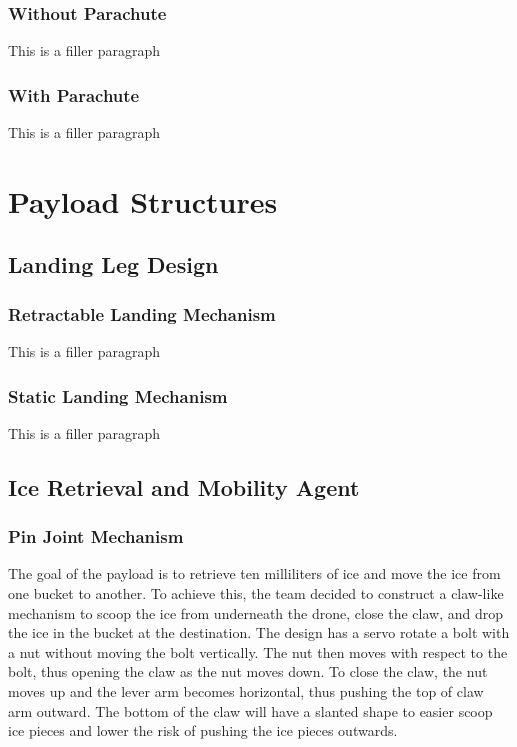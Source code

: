 		\subsubsection{Without Parachute}
			This is a filler paragraph
		
		\subsubsection{With Parachute}
			This is a filler paragraph

\section{Payload Structures}\label{PL:Deployment:Structures}
	\subsection{Landing Leg Design}
		\subsubsection{Retractable Landing Mechanism}
			This is a filler paragraph

		\subsubsection{Static Landing Mechanism}
			This is a filler paragraph

	\subsection{Ice Retrieval and Mobility Agent}
		\subsubsection{Pin Joint Mechanism}
			The goal of the payload is to retrieve ten milliliters of ice and move the ice from one bucket to another. To achieve this, the team decided to construct a claw-like mechanism to scoop the ice from underneath the drone, close the claw, and drop the ice in the bucket at the destination. The design has a servo rotate a bolt with a nut without moving the bolt vertically. The nut then moves with respect to the bolt, thus opening the claw as the nut moves down. To close the claw, the nut moves up and the lever arm becomes horizontal, thus pushing the top of claw arm outward. The bottom of the claw will have a slanted shape to easier scoop ice pieces and lower the risk of pushing the ice pieces outwards. 


